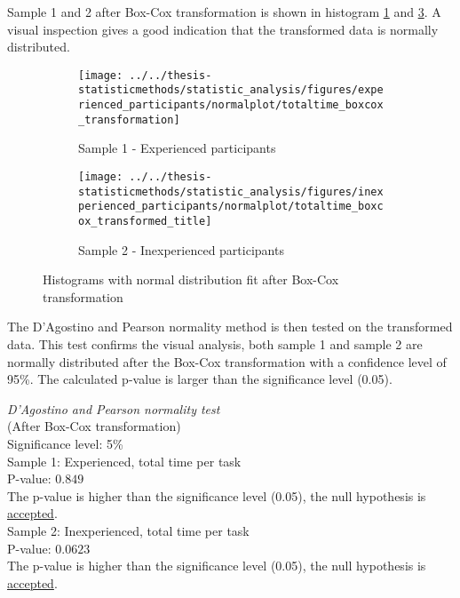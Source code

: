 Sample 1 and 2 after Box-Cox transformation is shown in histogram \ref{fig:totaltimeboxcoxtransformation_experienced} and \ref{fig:totaltimeboxcoxtransformedtitle_inexperienced}. A visual inspection gives a good indication that the transformed data is normally distributed.

\begin{figure}[H]
	\centering
	\begin{subfigure}[b]{0.48\textwidth}
		\centering
		\texttt{[image: ../../thesis-statisticmethods/statistic\_analysis/figures/experienced\_participants/normalplot/totaltime\_boxcox\_transformation]}
		\caption[Experienced, Box-Cox]{Sample 1 - Experienced participants}
		\label{fig:totaltimeboxcoxtransformation_experienced}
	\end{subfigure}
	\begin{subfigure}[b]{0.48\textwidth}
		\centering
		\texttt{[image: ../../thesis-statisticmethods/statistic\_analysis/figures/inexperienced\_participants/normalplot/totaltime\_boxcox\_transformed\_title]}
		\caption[Inexperienced, Box-Cox]{Sample 2 - Inexperienced participants}
		\label{fig:totaltimeboxcoxtransformedtitle_inexperienced}
	\end{subfigure}
\caption{Histograms with normal distribution fit after Box-Cox transformation}
\end{figure}

The D'Agostino and Pearson normality method is then tested on the transformed data. This test confirms the visual analysis, both sample 1 and sample 2 are normally distributed after the Box-Cox transformation with a confidence level of 95\%. The calculated p-value is larger than the significance level (0.05). \\[0.5cm] 

\begin{center}
	\begin{tcolorbox}[width=0.8\textwidth]
		\centering
		\textit{D'Agostino and Pearson normality test}\\
		(After Box-Cox transformation) \\
		Significance level: 5\%  \\[0.5cm]
		
		Sample 1: Experienced, total time per task\\
		P-value: $0.849$\\
		The p-value is higher than the significance level (0.05), the null hypothesis is \underline{accepted}. \\[0.5cm]
		
		Sample 2: Inexperienced, total time per task \\ %
		P-value: $0.0623$ \\
		The p-value is higher than the significance level (0.05), the null hypothesis is \underline{accepted}. \\[0.5cm]
	\end{tcolorbox}
\end{center}

